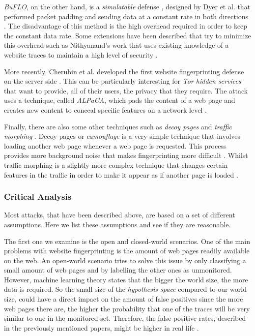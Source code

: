 \textit{BuFLO}, on the other hand, is a \textit{simulatable} defense \cite{wang_cai_johnson_nithyanand_goldberg_2014}, designed by Dyer et al. that performed packet padding and sending data at a constant rate in both directions \cite{dyer2012peek}.
The disadvantage of this method is the high overhead required in order to keep the constant data rate.
Some extensions have been described that try to minimize this overhead such as  Nithyanand's work that uses existing knowledge of a website traces to maintain a high level of security \cite{nithyanand2014glove}.

More recently, Cherubin et al. developed the first website fingerprinting defense on the server side \cite{cherubin2017website}.
This can be particularly interesting for \textit{Tor hidden services} that want to provide, all of their users, the privacy that they require.
The attack uses a technique, called \textit{ALPaCA}, which pads the content of a web page and creates new content to conceal specific features on a network level \cite{cherubin2017website}.

Finally, there are also some other techniques such as \textit{decoy pages} and \textit{traffic morphing} \cite{wright2009traffic,panchenko1}.
Decoy pages or \textit{camouflage} is a very simple technique that involves loading another web page whenever a web page is requested.
This process provides more background noise that makes fingerprinting more difficult \cite{panchenko1}.
Whilst traffic morphing is a slightly more complex technique that changes certain features in the traffic in order to make it appear as if another page is loaded \cite{wright2009traffic}.

\subsubsection{Critical Analysis}

Most attacks, that have been described above, are based on a set of different assumptions.
Here we list these assumptions and see if they are reasonable.

The first one we examine is the open and closed-world scenarios.
One of the main problems with website fingerprinting is the amount of web pages readily available on the web.
An open-world scenario tries to solve this issue by only classifying a small amount of web pages and by labelling the other ones as unmonitored.
However, machine learning theory states that the bigger the world size, the more data is required.
So the small size of the \textit{hypothesis space} compared to our world size, could have a direct impact on the amount of false positives
since the more web pages there are, the higher the probability that one of the traces will be very similar to one in the monitored set.
Therefore, the false positive rates, described in the previously mentioned papers, might be higher in real life \cite{wfpcritique}.

